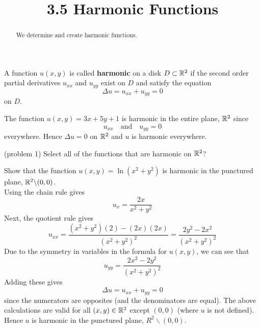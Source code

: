\documentclass[handout]{ximera}
\title{3.5 Harmonic Functions}
\begin{document}
\begin{abstract}
We determine and create harmonic functions.
\end{abstract}

\maketitle


\begin{definition}
A function $u(x,y)$ is called {\bf harmonic} on a disk $D \subset \mathbb R^2$ if the second order partial derivatives
$u_{xx}$ and $u_{yy}$ exist on $D$ and satisfy the equation
\[
\Delta u = u_{xx} + u_{yy} = 0
\]
on $D$.
\end{definition}

\begin{example}[example 1]
The function $u(x,y) = 3x + 5y +1$ is harmonic in the entire plane, $\mathbb R^2$ since
\[
u_{xx} \quad \text{and} \quad u_{yy} = 0
\]
everywhere. Hence $\Delta u = 0$ on $\mathbb R^2$ and $u$ is harmonic everywhere.
\end{example}

\begin{problem}(problem 1)
Select all of the functions that are harmonic on $\mathbb R^2$?\\
\begin{selectAll}
\end{selectAll}
\end{problem}


\begin{example}[example 2]
Show that the function $u(x,y) = \ln\left(x^2 + y^2\right)$ is harmonic in the 
punctured plane, $\mathbb R^2 \backslash (0,0)$.\\
Using the chain rule gives
\[
u_x = \frac{2x}{x^2 + y^2}
\]
Next, the quotient rule gives
\[
u_{xx} = \frac{(x^2+y^2)(2)- (2x)(2x)}{\left(x^2 +y^2\right)^2} = \frac{2y^2-2x^2}{\left(x^2 +y^2\right)^2}
\]
Due to the symmetry in variables in the formula for $u(x,y)$, we can see that
\[
u_{yy} = \frac{2x^2-2y^2}{\left(x^2 +y^2\right)^2}
\]
Adding these gives
\[
\Delta u = u_{xx} + u_{yy} = 0
\]
since the numerators are opposites (and the denominators are equal). 
The above calculations are valid for all $(x,y)\in \mathbb R^2$ except $(0,0)$ (where $u$ is not defined).  
Hence $u$ is harmonic in the punctured plane, $R^2\backslash (0,0)$.
\end{example}
\end{document}
